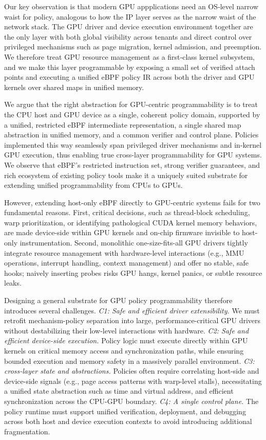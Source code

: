 Our key observation is that modern GPU appplications need an OS‑level narrow waist for policy, analogous to how the IP layer serves as the narrow waist of the network stack. The GPU driver and device execution environment together are the only layer with both global visibility across tenants and direct control over privileged mechanisms such as page migration, kernel admission, and preemption. We therefore treat GPU resource management as a first‑class kernel subsystem, and we make this layer programmable by exposing a small set of verified attach points and executing a unified eBPF policy IR across both the driver and GPU kernels over shared maps in unified memory.

We argue that the right abstraction for GPU-centric programmability is to treat the CPU host and GPU device as a single, coherent policy domain, supported by a unified, restricted eBPF intermediate representation, a single shared map abstraction in unified memory, and a common verifier and control plane. Policies implemented this way seamlessly span privileged driver mechanisms and in-kernel GPU execution, thus enabling true cross-layer programmability for GPU systems. We observe that eBPF's restricted instruction set, strong verifier guarantees, and rich ecosystem of existing policy tools make it a uniquely suited substrate for extending unified programmability from CPUs to GPUs.

However, extending host-only eBPF directly to GPU-centric systems fails for two fundamental reasons. First, critical decisions, such as thread-block scheduling, warp prioritization, or identifying pathological CUDA kernel memory behaviors, are made device-side within GPU kernels and on-chip firmware invisible to host-only instrumentation. Second, monolithic one-size-fits-all GPU drivers tightly integrate resource management with hardware-level interactions (e.g., MMU operations, interrupt handling, context management) and offer no stable, safe hooks; naively inserting probes risks GPU hangs, kernel panics, or subtle resource leaks.

Designing a general substrate for GPU policy programmability therefore introduces several challenges. \emph{C1: Safe and efficient driver extensibility.} We must retrofit mechanism-policy separation into large, performance-critical GPU drivers without destabilizing their low-level interactions with hardware. \emph{C2: Safe and efficient device-side execution.} Policy logic must execute directly within GPU kernels on critical memory access and synchronization paths, while ensuring bounded execution and memory safety in a massively parallel environment. \emph{C3: cross-layer state and abstractions.} Policies often require correlating host-side and device-side signals (e.g., page access patterns with warp-level stalls), necessitating a unified state abstraction such as time and virtual address, and efficient synchronization across the CPU-GPU boundary. \emph{C4: A single control plane.} The policy runtime must support unified verification, deployment, and debugging across both host and device execution contexts to avoid introducing additional fragmentation.

